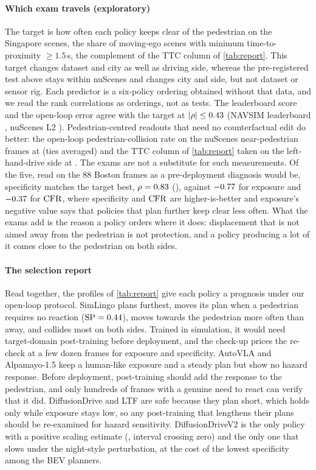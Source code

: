 \paragraph{Which exam travels (exploratory)}
The target is how often each policy keeps clear of the pedestrian on the Singapore scenes, the share
of moving-ego scenes with minimum time-to-proximity $\ge1.5$\,s, the complement of the TTC column of
\cref{tab:report}. This target changes dataset and city as well as driving side, whereas the pre-registered test above stays within nuScenes and changes city and side, but not dataset or sensor rig. Each predictor is a six-policy ordering obtained
without that data, and we read the rank correlations as orderings, not as tests. The leaderboard score and the open-loop error agree with the target at $|\rho|\le0.43$ (NAVSIM leaderboard \NumRhoLbKeep, nuScenes L2 \NumRhoLtwoKeep). Pedestrian-centred readouts that need no counterfactual edit do better: the open-loop pedestrian-collision rate on the nuScenes near-pedestrian frames at \NumRhoPedcolKeep{} (ties averaged) and the TTC column of \cref{tab:report} taken on the left-hand-drive side at \NumOtherSideTTC. The exams are not a substitute for such measurements. Of the five, read on the 88 Boston frames as a pre-deployment diagnosis would be, specificity matches the target best, $\rho=0.83$ (\NumSpLhdList), against ${-}0.77$ for exposure and ${-}0.37$ for $\mathrm{CFR}$, where specificity and
$\mathrm{CFR}$ are higher-is-better and exposure's negative value says that policies that plan further keep
clear less often. What the exams add is the reason a policy orders where it does: displacement that
is not aimed away from the pedestrian is not protection, and a policy producing a lot of it comes
close to the pedestrian on both sides.

\paragraph{The selection report}
Read together, the profiles of \cref{tab:report} give each policy a prognosis under our open-loop
protocol. SimLingo plans furthest, moves its plan when a pedestrian requires no reaction
($\mathrm{SP}=0.44$), moves towards the pedestrian more often than away, and collides most on both sides.
Trained in simulation, it would need target-domain post-training before deployment, and the check-up prices
the re-check at a few dozen frames for exposure and specificity. AutoVLA and Alpamayo-1.5 keep a
human-like exposure and a steady plan but show no hazard response. Before deployment, post-training should add the response to the pedestrian, and only hundreds of frames with a genuine need to react can verify that it did. DiffusionDrive and LTF are safe because
they plan short, which holds only while exposure stays low, so any post-training that lengthens their
plans should be re-examined for hazard sensitivity. DiffusionDriveV2 is the only policy with a positive scaling estimate (\NumScalHi, interval crossing zero) and the only one that slows under the night-style perturbation, at the cost of the lowest specificity among the BEV planners.

